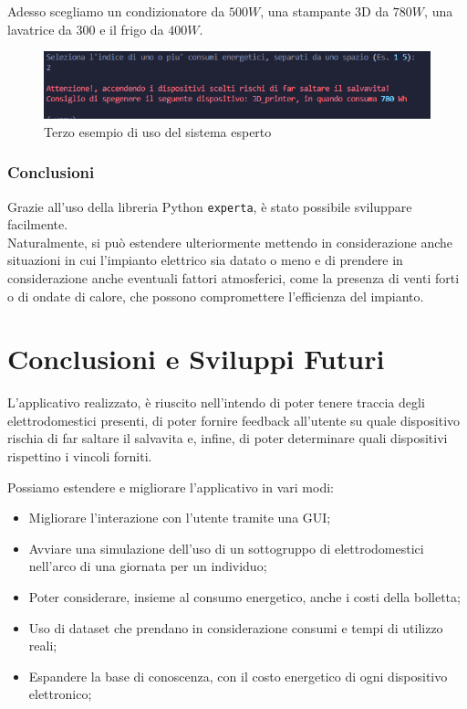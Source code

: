 \documentclass[12pt, letterpaper]{article}
\begin{document}
\noindent Adesso scegliamo un condizionatore da $500W$, una stampante 3D da $780W$, una
lavatrice da $300$ e il frigo da $400W$.

\begin{figure}[h]
      \centering
      \includegraphics[scale=0.8]{sistema-esperto-esempio-3.png}
      \caption{Terzo esempio di uso del sistema esperto}
\end{figure}

\subsubsection{Conclusioni}

Grazie all'uso della libreria Python \texttt{experta}, è stato possibile sviluppare facilmente. \\

\noindent Naturalmente, si può estendere ulteriormente mettendo in considerazione anche situazioni in cui
l'impianto elettrico sia datato o meno e di prendere in considerazione anche
eventuali fattori atmosferici, come la presenza di venti forti o di ondate di calore, che
possono compromettere l'efficienza del impianto.


\section{Conclusioni e Sviluppi Futuri}

L'applicativo realizzato, è riuscito nell'intendo di poter tenere traccia degli elettrodomestici
presenti, di poter fornire feedback all'utente su quale dispositivo rischia di far saltare il salvavita
e, infine, di poter determinare quali dispositivi rispettino i vincoli forniti.

\noindent Possiamo estendere e migliorare l'applicativo in vari modi:
\begin{itemize}
      \item Migliorare l'interazione con l'utente tramite una GUI;
      \item Avviare una simulazione dell'uso di un sottogruppo di elettrodomestici
            nell'arco di una giornata per un individuo;
      \item Poter considerare, insieme al consumo energetico, anche i costi della bolletta;
      \item Uso di dataset che prendano in considerazione consumi e tempi di utilizzo reali;
      \item Espandere la base di conoscenza, con il costo energetico di ogni dispositivo elettronico;
\end{itemize}
\end{document}
